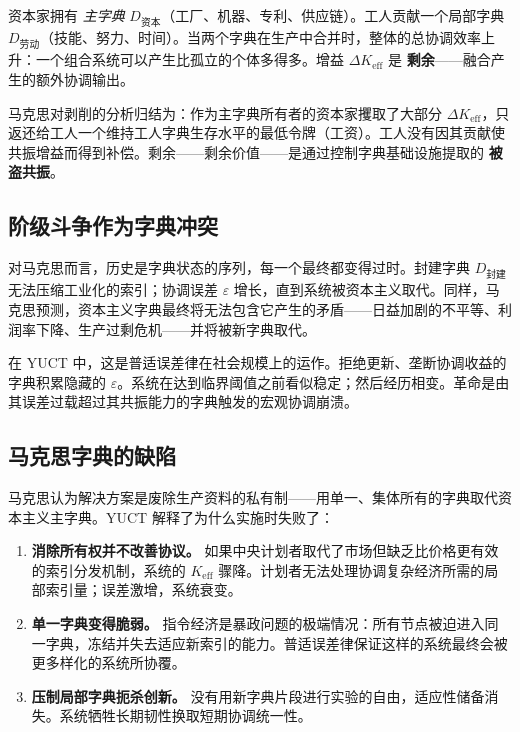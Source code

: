 \documentclass[12pt,a4paper]{article}
\newcommand{\Keff}{K_{\mathrm{eff}}}
\begin{document}
	资本家拥有 \emph{主字典} \(D_{\text{资本}}\)（工厂、机器、专利、供应链）。工人贡献一个局部字典 \(D_{\text{劳动}}\)（技能、努力、时间）。当两个字典在生产中合并时，整体的总协调效率上升：一个组合系统可以产生比孤立的个体多得多。增益 \(\Delta\Keff\) 是 \textbf{剩余}——融合产生的额外协调输出。
	
	马克思对剥削的分析归结为：作为主字典所有者的资本家攫取了大部分 \(\Delta\Keff\)，只返还给工人一个维持工人字典生存水平的最低令牌（工资）。工人没有因其贡献使共振增益而得到补偿。剩余——剩余价值——是通过控制字典基础设施提取的 \textbf{被盗共振}。
	
	\subsection{阶级斗争作为字典冲突}
	
	对马克思而言，历史是字典状态的序列，每一个最终都变得过时。封建字典 \(D_{\text{封建}}\) 无法压缩工业化的索引；协调误差 \(\varepsilon\) 增长，直到系统被资本主义取代。同样，马克思预测，资本主义字典最终将无法包含它产生的矛盾——日益加剧的不平等、利润率下降、生产过剩危机——并将被新字典取代。
	
	在 YUCT 中，这是普适误差律在社会规模上的运作。拒绝更新、垄断协调收益的字典积累隐藏的 \(\varepsilon\)。系统在达到临界阈值之前看似稳定；然后经历相变。革命是由其误差过载超过其共振能力的字典触发的宏观协调崩溃。
	
	\subsection{马克思字典的缺陷}
	
	马克思认为解决方案是废除生产资料的私有制——用单一、集体所有的字典取代资本主义主字典。YUCT 解释了为什么实施时失败了：
	
	\begin{enumerate}[leftmargin=*]
		\item \textbf{消除所有权并不改善协议。} 如果中央计划者取代了市场但缺乏比价格更有效的索引分发机制，系统的 \(\Keff\) 骤降。计划者无法处理协调复杂经济所需的局部索引量；误差激增，系统衰变。
		\item \textbf{单一字典变得脆弱。} 指令经济是暴政问题的极端情况：所有节点被迫进入同一字典，冻结并失去适应新索引的能力。普适误差律保证这样的系统最终会被更多样化的系统所协覆。
		\item \textbf{压制局部字典扼杀创新。} 没有用新字典片段进行实验的自由，适应性储备消失。系统牺牲长期韧性换取短期协调统一性。
	\end{enumerate}
	
\end{document}
